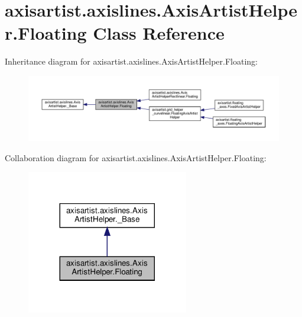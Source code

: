\hypertarget{classaxisartist_1_1axislines_1_1AxisArtistHelper_1_1Floating}{}\section{axisartist.\+axislines.\+Axis\+Artist\+Helper.\+Floating Class Reference}
\label{classaxisartist_1_1axislines_1_1AxisArtistHelper_1_1Floating}


Inheritance diagram for axisartist.\+axislines.\+Axis\+Artist\+Helper.\+Floating\+:
\nopagebreak
\begin{figure}[H]
\begin{center}
\leavevmode
\includegraphics[width=350pt]{classaxisartist_1_1axislines_1_1AxisArtistHelper_1_1Floating__inherit__graph}
\end{center}
\end{figure}


Collaboration diagram for axisartist.\+axislines.\+Axis\+Artist\+Helper.\+Floating\+:
\nopagebreak
\begin{figure}[H]
\begin{center}
\leavevmode
\includegraphics[width=200pt]{classaxisartist_1_1axislines_1_1AxisArtistHelper_1_1Floating__coll__graph}
\end{center}
\end{figure}
